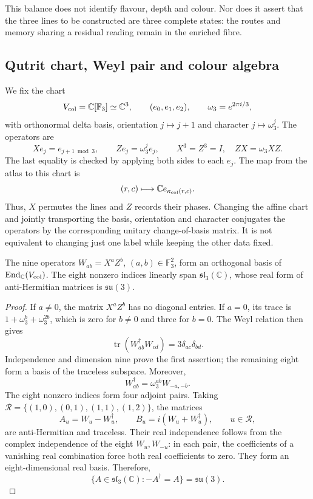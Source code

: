 This balance does not identify flavour, depth and colour. Nor does it assert that the three lines to be constructed are three complete states: the routes and memory sharing a residual reading remain in the enriched fibre.

\subsection{Qutrit chart, Weyl pair and colour algebra}
\label{hmtcuatro:color:weyl}

We fix the chart
\[
 V_{\rm col}=\mathbb C[\mathbb F_3]\simeq\mathbb C^3,
 \qquad (e_0,e_1,e_2),\qquad
 \omega_3=e^{2\pi i/3},
\]
with orthonormal delta basis, orientation \(j\mapsto j+1\) and character \(j\mapsto\omega_3^j\). The operators are
\[
 Xe_j=e_{j+1\bmod3},\qquad Ze_j=\omega_3^j e_j,
 \qquad X^3=Z^3=I,\quad ZX=\omega_3XZ.
\]
The last equality is checked by applying both sides to each \(e_j\). The map from the atlas to this chart is
\[
 (r,c)\longmapsto\mathbb C e_{\kappa_{\rm col}(r,c)}.
\]
Thus, \(X\) permutes the lines and \(Z\) records their phases. Changing the affine chart and jointly transporting the basis, orientation and character conjugates the operators by the corresponding unitary change-of-basis matrix. It is not equivalent to changing just one label while keeping the other data fixed.

\begin{theorem}
\label{hmtcuatro:color:algebra} The nine operators \(W_{ab}=X^aZ^b\), \((a,b)\in\mathbb F_3^2\), form an orthogonal basis of \(\operatorname{End}_{\mathbb C}(V_{\rm col})\). The eight nonzero indices linearly span \(\mathfrak{sl}_3(\mathbb C)\), whose real form of anti-Hermitian matrices is \(\mathfrak{su}(3)\).
\end{theorem}
\begin{proof}
If \(a\ne0\), the matrix \(X^aZ^b\) has no diagonal entries. If \(a=0\), its trace is \(1+\omega_3^b+\omega_3^{2b}\), which is zero for \(b\ne0\) and three for \(b=0\). The Weyl relation then gives
\[
 \operatorname{tr}(W_{ab}^{\dagger}W_{cd})
 =3\delta_{ac}\delta_{bd}.
\]
Independence and dimension nine prove the first assertion; the remaining eight form a basis of the traceless subspace. Moreover,
\[
 W_{ab}^{\dagger}=\omega_3^{ab}W_{-a,-b}.
\]
The eight nonzero indices form four adjoint pairs. Taking \(\mathcal R=\{(1,0),(0,1),(1,1),(1,2)\}\), the matrices
\[
 A_u=W_u-W_u^{\dagger},\qquad
 B_u=i(W_u+W_u^{\dagger}),\qquad u\in\mathcal R,
\]
are anti-Hermitian and traceless. Their real independence follows from the complex independence of the eight \(W_u,W_{-u}\): in each pair, the coefficients of a vanishing real combination force both real coefficients to zero. They form an eight-dimensional real basis. Therefore,
\[
 \{A\in\mathfrak{sl}_3(\mathbb C):-A^{\dagger}=A\}
 =\mathfrak{su}(3).
\]
\end{proof}

